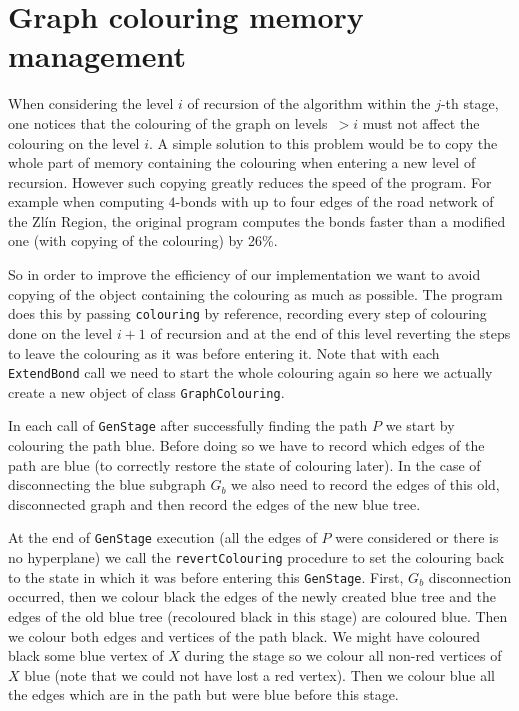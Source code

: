 \section{Graph colouring memory management}

When considering the level $i$ of recursion of the algorithm within the $j$-th stage, one notices that the colouring of the graph on levels~${>i}$ must not affect the colouring on the level $i$. A simple solution to this problem would be to copy the whole part of memory containing the colouring when entering a new level of recursion. However such copying greatly reduces the speed of the program. For example when computing $4$-bonds with up to four edges of the road network of the Zlín Region, the original program computes the bonds faster than a modified one (with copying of the colouring) by 26\%.

So in order to improve the efficiency of our implementation we want to avoid copying of the object containing the colouring as much as possible. The program does this by passing \lstinline|colouring| by reference, recording every step of colouring done on the level $i + 1$ of recursion and at the end of this level reverting the steps to leave the colouring as it was before entering it. Note that with each \lstinline|ExtendBond| call we need to start the whole colouring again so here we actually create a new object of class \lstinline|GraphColouring|.

In each call of \lstinline|GenStage| after successfully finding the path $P$ we start by colouring the path blue. Before doing so we have to record which edges of the path are blue (to correctly restore the state of colouring later). In the case of disconnecting the blue subgraph $G_b$ we also need to record the edges of this old, disconnected graph and then record the edges of the new blue tree.

At the end of \lstinline|GenStage| execution (all the edges of $P$ were considered or there is no hyperplane) we call the \lstinline|revertColouring| procedure to set the colouring back to the state in which it was before entering this \lstinline|GenStage|. First, $G_b$ disconnection occurred, then we colour black the edges of the newly created blue tree and the edges of the old blue tree (recoloured black in this stage) are coloured blue. Then we colour both edges and vertices of the path black. We might have coloured black some blue vertex of $X$ during the stage so we colour all non-red vertices of $X$ blue (note that we could not have lost a red vertex). Then we colour blue all the edges which are in the path but were blue before this stage.

